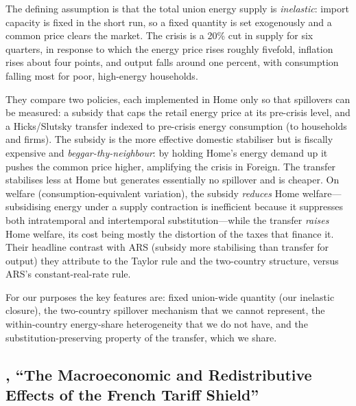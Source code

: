 \documentclass[11pt,a4paper]{article}
\begin{document}
The defining assumption is that the total union energy supply is
\emph{inelastic}: import capacity is fixed in the short run, so a fixed quantity
is set exogenously and a common price clears the market. The crisis is a 20\%
cut in supply for six quarters, in response to which the energy price rises
roughly fivefold, inflation rises about four points, and output falls around
one percent, with consumption falling most for poor, high-energy households.

They compare two policies, each implemented in Home only so that spillovers can
be measured: a subsidy that caps the retail energy price at its pre-crisis
level, and a Hicks/Slutsky transfer indexed to pre-crisis energy consumption
(to households and firms). The subsidy is the more effective domestic
stabiliser but is fiscally expensive and \emph{beggar-thy-neighbour}: by
holding Home's energy demand up it pushes the common price higher, amplifying
the crisis in Foreign. The transfer stabilises less at Home but generates
essentially no spillover and is cheaper. On welfare (consumption-equivalent
variation), the subsidy \emph{reduces} Home welfare---subsidising energy under a
supply contraction is inefficient because it suppresses both intratemporal and
intertemporal substitution---while the transfer \emph{raises} Home welfare, its
cost being mostly the distortion of the taxes that finance it. Their headline
contrast with ARS (subsidy more stabilising than transfer for output) they
attribute to the Taylor rule and the two-country structure, versus ARS's
constant-real-rate rule.

For our purposes the key features are: fixed union-wide quantity (our inelastic
closure), the two-country spillover mechanism that we cannot represent, the
within-country energy-share heterogeneity that we do not have, and the
substitution-preserving property of the transfer, which we share.

\subsection{\citet{Langot2026}, ``The Macroeconomic and Redistributive Effects
of the French Tariff Shield''}
\end{document}
